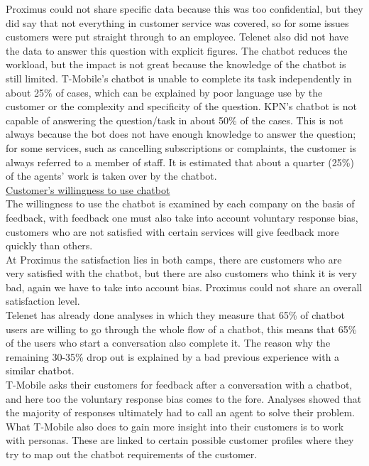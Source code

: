 Proximus could not share specific data because this was too confidential, but they did say that not everything in customer service was covered, so for some issues customers were put straight through to an employee. Telenet also did not have the data to answer this question with explicit figures. The chatbot reduces the workload, but the impact is not great because the knowledge of the chatbot is still limited. T-Mobile's chatbot is unable to complete its task independently in about 25\% of cases, which can be explained by poor language use by the customer or the complexity and specificity of the question. KPN's chatbot is not capable of answering the question/task in about 50\% of the cases. This is not always because the bot does not have enough knowledge to answer the question; for some services, such as cancelling subscriptions or complaints, the customer is always referred to a member of staff. It is estimated that about a quarter (25\%) of the agents' work is taken over by the chatbot.\\
\break
\ul{Customer's willingness to use chatbot}\\
The willingness to use the chatbot is examined by each company on the basis of feedback, with feedback one must also take into account voluntary response bias, customers who are not satisfied with certain services will give feedback more quickly than others.\\ 
\break
At Proximus the satisfaction lies in both camps, there are customers who are very satisfied with the chatbot, but there are also customers who think it is very bad, again we have to take into account bias. Proximus could not share an overall satisfaction level.\\
\break
Telenet has already done analyses in which they measure that 65\% of chatbot users are willing to go through the whole flow of a chatbot, this means that 65\% of the users who start a conversation also complete it. The reason why the remaining 30-35\% drop out is explained by a bad previous experience with a similar chatbot.\\
\break
T-Mobile asks their customers for feedback after a conversation with a chatbot, and here too the voluntary response bias comes to the fore. Analyses showed that the majority of responses ultimately had to call an agent to solve their problem. What T-Mobile also does to gain more insight into their customers is to work with personas. These are linked to certain possible customer profiles where they try to map out the chatbot requirements of the customer.\\
